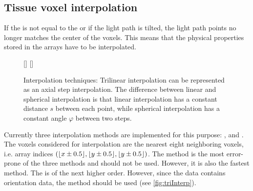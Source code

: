 \subsection{Tissue voxel interpolation}
%
If the \Stepsize is not equal to the \Voxelsize or if the light path is tilted, the light path points no longer matches the center of the voxels.
This means that the physical properties stored in the arrays have to be interpolated.
%
\begin{figure}[!t]
\centering
\setlength{\tikzwidth}{0.45\textwidth}
[\tikzwidth]{
\hfill{}\hfill}\hfill
{}[\tikzwidth]{
}
\caption{Interpolation techniques: Trilinear interpolation can be represented as an axial step interpolation. The difference between linear and spherical interpolation is that linear interpolation has a constant distance $s$ between each point, while spherical interpolation has a constant angle $\varphi$ between two steps.}
\label{fig:vectorfield_disc}
\end{figure}
%
Currently three interpolation methods are implemented for this purpose: ,  and .
The voxels considered for interpolation are the nearest eight neighboring voxels, i.e. array indices $(\lfloor x\pm0.5\rfloor,\lfloor y\pm0.5\rfloor,\lfloor y\pm0.5\rfloor)$.
The  method is the most error-prone of the three methods and should not be used.
However, it is also the fastest method.
The  is of the next higher order.
However, since the data contains orientation data, the  method should be used (see \cref{fig:triInterp}).
%
%
%
